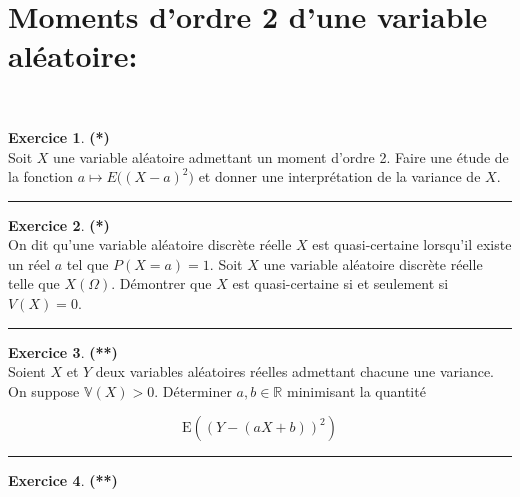 \documentclass[a4paper,11pt]{article}
\theoremstyle{definition}
\newtheorem{exo}{Exercice} %
\begin{document}
\section*{Moments d'ordre 2 d'une variable aléatoire:}\hfill\\%


\begin{minipage}{1\linewidth}\begin{minipage}[t]{0.48\linewidth}\raggedright
		
		\begin{exo}\textbf{(*)}\quad\\[0.2cm] %
		Soit $X$ une variable aléatoire admettant un moment d'ordre 2. Faire une étude de la fonction $a\mapsto E\big((X-a)^2\big)$ et donner une interprétation de la variance de $X$. 
						
			\centering\rule{1\linewidth}{0.6pt}\end{exo}
		
				\begin{exo}\textbf{(*)}\quad\\[0.2cm]
			On dit qu'une variable aléatoire discrète réelle $X$ est quasi-certaine lorsqu'il existe un réel $a$ tel que $P(X=a)=1$. Soit $X$ une variable aléatoire discrète réelle telle que $X(\Omega)$. Démontrer que $X$ est quasi-certaine si et seulement si $V(X)=0$.
			
			\centering\rule{1\linewidth}{0.6pt}\end{exo}
		
		
		\begin{exo}\textbf{(**)}\quad\\[0.2cm]
			Soient $X$ et $Y$ deux variables aléatoires réelles admettant chacune une variance. On suppose $\mathbb{V}(X)>0$. Déterminer $a, b \in \mathbb{R}$ minimisant la quantité
			
			$$
			\mathrm{E}\left((Y-(a X+b))^{2}\right)
			$$
			\centering\rule{1\linewidth}{0.6pt}\end{exo}
		
		
		
		
	\end{minipage}\hfill\vrule\hfill\begin{minipage}[t]{0.48\linewidth}\raggedright
		

		
		
		\begin{exo}\textbf{(**)}\quad\\[0.2cm] %
			

\end{exo}
\end{minipage}
\end{minipage}
\end{document}
